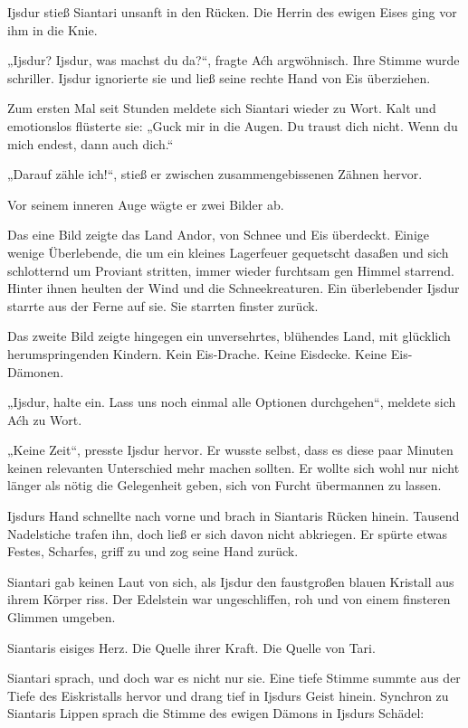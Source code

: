Ijsdur stieß Siantari unsanft in den Rücken. Die Herrin des ewigen Eises ging vor ihm in die Knie.

„Ijsdur? Ijsdur, was machst du da?“, fragte Aćh argwöhnisch. Ihre Stimme wurde schriller. Ijsdur ignorierte sie und ließ seine rechte Hand von Eis überziehen.

Zum ersten Mal seit Stunden meldete sich Siantari wieder zu Wort. Kalt und emotionslos flüsterte sie: „Guck mir in die Augen. Du traust dich nicht. Wenn du mich endest, dann auch dich.“

„Darauf zähle ich!“, stieß er zwischen zusammengebissenen Zähnen hervor.

Vor seinem inneren Auge wägte er zwei Bilder ab.

Das eine Bild zeigte das Land Andor, von Schnee und Eis überdeckt. Einige wenige Überlebende, die um ein kleines Lagerfeuer gequetscht dasaßen und sich schlotternd um Proviant stritten, immer wieder furchtsam gen Himmel starrend. Hinter ihnen heulten der Wind und die Schneekreaturen. Ein überlebender Ijsdur starrte aus der Ferne auf sie. Sie starrten finster zurück.

Das zweite Bild zeigte hingegen ein unversehrtes, blühendes Land, mit glücklich herumspringenden Kindern. Kein Eis-Drache. Keine Eisdecke. Keine Eis-Dämonen.

„Ijsdur, halte ein. Lass uns noch einmal alle Optionen durchgehen“, meldete sich Aćh zu Wort.

„Keine Zeit“, presste Ijsdur hervor. Er wusste selbst, dass es diese paar Minuten keinen relevanten Unterschied mehr machen sollten. Er wollte sich wohl nur nicht länger als nötig die Gelegenheit geben, sich von Furcht übermannen zu lassen.

Ijsdurs Hand schnellte nach vorne und brach in Siantaris Rücken hinein. Tausend Nadelstiche trafen ihn, doch ließ er sich davon nicht abkriegen. Er spürte etwas Festes, Scharfes, griff zu und zog seine Hand zurück.

Siantari gab keinen Laut von sich, als Ijsdur den faustgroßen blauen Kristall aus ihrem Körper riss. Der Edelstein war ungeschliffen, roh und von einem finsteren Glimmen umgeben.

Siantaris eisiges Herz. Die Quelle ihrer Kraft. Die Quelle von Tari.

Siantari sprach, und doch war es nicht nur sie. Eine tiefe Stimme summte aus der Tiefe des Eiskristalls hervor und drang tief in Ijsdurs Geist hinein. Synchron zu Siantaris Lippen sprach die Stimme des ewigen Dämons in Ijsdurs Schädel:


